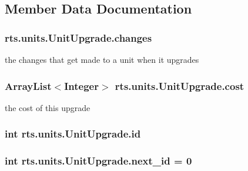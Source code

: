\subsection{Member Data Documentation}
\hypertarget{classrts_1_1units_1_1_unit_upgrade_a8a1f4874a8d64399d6f0a11bafd6acad}{
\subsubsection[{changes}]{ {\bf rts.units.UnitUpgrade.changes}}}
\label{classrts_1_1units_1_1_unit_upgrade_a8a1f4874a8d64399d6f0a11bafd6acad}
the changes that get made to a unit when it upgrades \hypertarget{classrts_1_1units_1_1_unit_upgrade_a887393d251efbd6d1708b021ea8ad5d3}{
\subsubsection[{cost}]{\setlength{\rightskip}{0pt plus 5cm}ArrayList$<$Integer$>$ {\bf rts.units.UnitUpgrade.cost}}}
\label{classrts_1_1units_1_1_unit_upgrade_a887393d251efbd6d1708b021ea8ad5d3}
the cost of this upgrade \hypertarget{classrts_1_1units_1_1_unit_upgrade_ab48ffcbc7f0e7ec226165b4c5da227c8}{
\subsubsection[{id}]{\setlength{\rightskip}{0pt plus 5cm}int {\bf rts.units.UnitUpgrade.id}}}
\label{classrts_1_1units_1_1_unit_upgrade_ab48ffcbc7f0e7ec226165b4c5da227c8}
\hypertarget{classrts_1_1units_1_1_unit_upgrade_aaae17d05b9a3bffc0cc1af2ff238f261}{
\subsubsection[{next\_\-id}]{\setlength{\rightskip}{0pt plus 5cm}int {\bf rts.units.UnitUpgrade.next\_\-id} = 0}}
